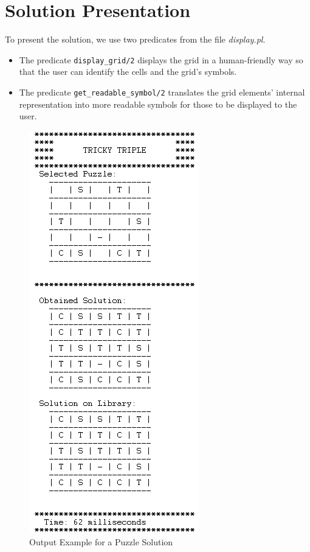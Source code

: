 \documentclass[runningheads]{llncs}
\begin{document}
\section{Solution Presentation}
To present the solution, we use two predicates from the file \textit{display.pl}.
\begin{itemize}
    \item The predicate \verb|display_grid/2| displays the grid in a human-friendly way so that
        the user can identify the cells and the grid's symbols.
    \item The predicate \verb|get_readable_symbol/2| translates the grid elements' internal representation
        into more readable symbols for those to be displayed to the user.
\end{itemize}
\begin{figure}
    \centering
    \includegraphics[scale=0.7]{img/puzzle_solving.png}
    \caption{Output Example for a Puzzle Solution} \label{fig2}
\end{figure}
\end{document}

